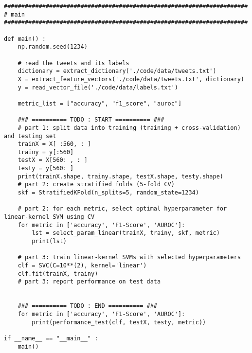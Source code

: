 \documentclass[11pt]{article}
\begin{document}
\begin{verbatim}
######################################################################
# main
######################################################################
    
def main() :
    np.random.seed(1234)
    
    # read the tweets and its labels   
    dictionary = extract_dictionary('./code/data/tweets.txt')
    X = extract_feature_vectors('./code/data/tweets.txt', dictionary)
    y = read_vector_file('./code/data/labels.txt')
    
    metric_list = ["accuracy", "f1_score", "auroc"]
    
    ### ========== TODO : START ========== ###
    # part 1: split data into training (training + cross-validation) and testing set
    trainX = X[ :560, : ]
    trainy = y[:560]
    testX = X[560: , : ]
    testy = y[560: ]
    print(trainX.shape, trainy.shape, testX.shape, testy.shape)
    # part 2: create stratified folds (5-fold CV)
    skf = StratifiedKFold(n_splits=5, random_state=1234)

    # part 2: for each metric, select optimal hyperparameter for linear-kernel SVM using CV
    for metric in ['accuracy', 'F1-Score', 'AUROC']:
        lst = select_param_linear(trainX, trainy, skf, metric)
        print(lst)
        
    # part 3: train linear-kernel SVMs with selected hyperparameters
    clf = SVC(C=10**(2), kernel='linear')
    clf.fit(trainX, trainy)
    # part 3: report performance on test data
    
    
    ### ========== TODO : END ========== ###
    for metric in ['accuracy', 'F1-Score', 'AUROC']:
        print(performance_test(clf, testX, testy, metric))
    
if __name__ == "__main__" :
    main()
    
\end{verbatim}
\end{document}
